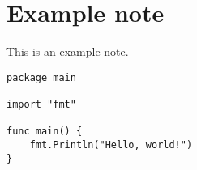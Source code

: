 \documentclass{note}
\begin{document}
\noteheader{\breadcrumbs}

\section{Example note}
This is an example note.
\begin{verbatim}
package main

import "fmt"

func main() {
    fmt.Println("Hello, world!")
}
\end{verbatim}
\end{document}

